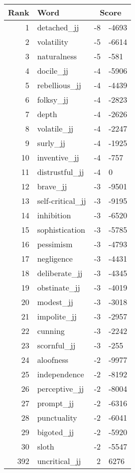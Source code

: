 \begin{longtable}[!htbp]{| rlr@{.}l |}
    \hline
    \textbf{Rank} & \textbf{Word} & \multicolumn{2}{c|}{\textbf{Score}} \\
    \hline
    \endhead
    1 & detached\_jj & -8 & -4693 \\
    2 & volatility & -5 & -6614 \\
    3 & naturalness & -5 & -581 \\
    4 & docile\_jj & -4 & -5906 \\
    5 & rebellious\_jj & -4 & -4439 \\
    6 & folksy\_jj & -4 & -2823 \\
    7 & depth & -4 & -2626 \\
    8 & volatile\_jj & -4 & -2247 \\
    9 & surly\_jj & -4 & -1925 \\
    10 & inventive\_jj & -4 & -757 \\
    11 & distrustful\_jj & -4 & 0 \\
    12 & brave\_jj & -3 & -9501 \\
    13 & self-critical\_jj & -3 & -9195 \\
    14 & inhibition & -3 & -6520 \\
    15 & sophistication & -3 & -5785 \\
    16 & pessimism & -3 & -4793 \\
    17 & negligence & -3 & -4431 \\
    18 & deliberate\_jj & -3 & -4345 \\
    19 & obstinate\_jj & -3 & -4019 \\
    20 & modest\_jj & -3 & -3018 \\
    21 & impolite\_jj & -3 & -2957 \\
    22 & cunning & -3 & -2242 \\
    23 & scornful\_jj & -3 & -255 \\
    24 & aloofness & -2 & -9977 \\
    25 & independence & -2 & -8192 \\
    26 & perceptive\_jj & -2 & -8004 \\
    27 & prompt\_jj & -2 & -6316 \\
    28 & punctuality & -2 & -6041 \\
    29 & bigoted\_jj & -2 & -5920 \\
    30 & sloth & -2 & -5547 \\
    392 & uncritical\_jj & 2 & 6276 \\

\end{longtable}
